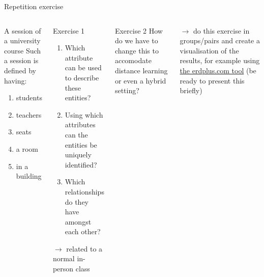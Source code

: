\begin{frame}{Repetition exercise}
  \begin{columns}%
    \footnotesize
    \begin{block}{A session of a university course}
    Such a session is defined by having:
    \begin{enumerate}
        \item students
        \item teachers
        \item seats
        \item a room
        \item in a building
    \end{enumerate}
    \end{block}


      \footnotesize
      \begin{exampleblock}{Exercise 1}
      \begin{enumerate}
          \item Which attribute can be used to describe these entities? %
          \item Using which attributes can the entities be uniquely identified? %
          \item Which relationships do they have amongst each other? %
      \end{enumerate}
      $\to$ related to a normal in-person class %
      \end{exampleblock}
      \begin{exampleblock}{Exercise 2}
      How do we have to change this to accomodate distance learning or even a hybrid setting? %
      \end{exampleblock}
      \footnotesize
      $\to$ do this exercise in groups/pairs and create a visualisation of the results, for example using \href{https://erdplus.com/standalone}{the erdplus.com tool} (be ready to present this briefly) %
  \end{columns}

\end{frame}


